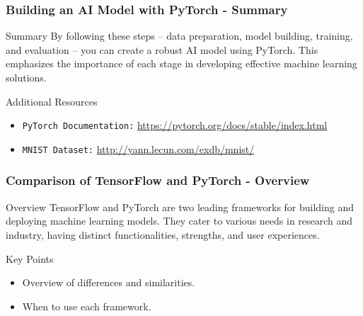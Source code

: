 \documentclass[aspectratio=169]{beamer}
\begin{document}
\begin{frame}[fragile]
    \frametitle{Building an AI Model with PyTorch - Summary}
    \begin{block}{Summary}
        By following these steps – data preparation, model building, training, and evaluation – you can create a robust AI model using PyTorch. 
        This emphasizes the importance of each stage in developing effective machine learning solutions.
    \end{block}

    \begin{block}{Additional Resources}
        \begin{itemize}
            \item \texttt{PyTorch Documentation:} \url{https://pytorch.org/docs/stable/index.html}
            \item \texttt{MNIST Dataset:} \url{http://yann.lecun.com/exdb/mnist/}
        \end{itemize}
    \end{block}
\end{frame}

\begin{frame}[fragile]
    \frametitle{Comparison of TensorFlow and PyTorch - Overview}
    \begin{block}{Overview}
        TensorFlow and PyTorch are two leading frameworks for building and deploying machine learning models. 
        They cater to various needs in research and industry, having distinct functionalities, strengths, and user experiences.
    \end{block}

    \begin{block}{Key Points}
        \begin{itemize}
            \item Overview of differences and similarities.
            \item When to use each framework.
        \end{itemize}
    \end{block}
\end{frame}
\end{document}
